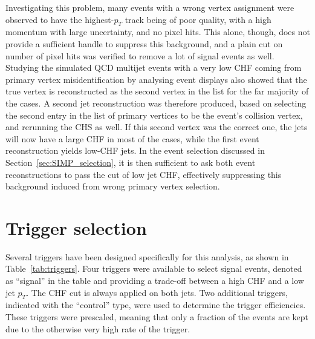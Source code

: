 Investigating this problem, many events with a wrong vertex assignment were observed to have the highest-$p_T$ track being of poor quality, with a high momentum with large uncertainty, and no pixel hits. This alone, though, does not provide a sufficient handle to suppress this background, and a plain cut on number of pixel hits was verified to remove a lot of signal events as well.
Studying the simulated \ac{QCD} multijet events with a very low CHF coming from primary vertex misidentification by analysing event displays also showed that the true vertex is reconstructed as the second vertex in the list for the far majority of the cases. A second jet reconstruction was therefore produced, based on selecting the second entry in the list of primary vertices to be the event's collision vertex, and rerunning the \ac{CHS} as well. If this second vertex was the correct one, the jets will now have a large CHF in most of the cases, while the first event reconstruction yields low-CHF jets. In the event selection discussed in Section~\ref{sec:SIMP_selection}, it is then sufficient to ask both event reconstructions to pass the cut of low jet CHF, effectively suppressing this background induced from wrong primary vertex selection.

\section{Trigger selection}
\label{sec:SIMP_trigger}

Several triggers have been designed specifically for this analysis, as shown in Table~\ref{tab:triggers}. Four triggers were available to select signal events, denoted as ``signal'' in the table and providing a trade-off between a high CHF and a low jet $p_T$. The CHF cut is always applied on both jets. Two additional triggers, indicated with the ``control'' type, were used to determine the trigger efficiencies. These triggers were prescaled, meaning that only a fraction of the events are kept due to the otherwise very high rate of the trigger.

